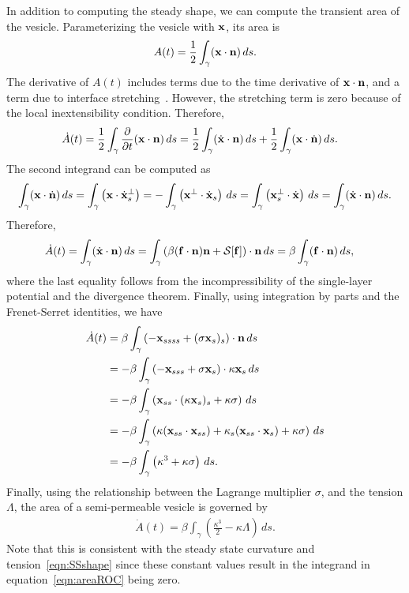 \documentclass[aps,prl,showpacs]{revtex4}
\begin{document}
In addition to computing the steady shape, we can compute the transient
area of the vesicle. Parameterizing the vesicle with $\mathbf{x}$, its area is
\begin{align}
  A(t) = \frac{1}{2}\int_{\gamma} (\mathbf{x} \cdot \mathbf{n})\, ds .
\end{align}
The derivative of $A(t)$ includes terms due to the time derivative of
$\mathbf{x} \cdot \mathbf{n}$, and a term due to interface
stretching~\cite{lai-tse-hua2008}. However, the stretching term is zero
because of the local inextensibility condition. Therefore,
\begin{align}
  \dot{A}(t) &= \frac{1}{2} \int_{\gamma} \frac{\partial }{\partial t} 
    (\mathbf{x} \cdot \mathbf{n}) \, ds = 
  \frac{1}{2} \int_{\gamma} (\dot{\mathbf{x}} \cdot \mathbf{n})\, ds  + 
  \frac{1}{2} \int_{\gamma} (\mathbf{x} \cdot \dot{\mathbf{n}})\, ds.
\end{align}
The second integrand can be computed as
\begin{align}
  \int_\gamma (\mathbf{x} \cdot \dot{\mathbf{n}})\, ds 
    = \int_\gamma \left(\mathbf{x} \cdot \dot{\mathbf{x}}_s^\perp \right)
    = -\int_\gamma \left(\mathbf{x}^\perp \cdot \dot{\mathbf{x}}_s\right)\, ds 
    = \int_\gamma \left(\mathbf{x}_s^\perp \cdot \dot{\mathbf{x}}\right)\, ds 
    = \int_\gamma (\dot{\mathbf{x}} \cdot \mathbf{n})\, ds.
\end{align}
Therefore,
\begin{align}
  \dot{A}(t) &= \int_\gamma (\dot{\mathbf{x}} \cdot \mathbf{n})\, ds 
  = \int_\gamma \left(\beta (\mathbf{f} \cdot \mathbf{n})\mathbf{n} + \mathcal{S}[\mathbf{f}]\right) 
      \cdot \mathbf{n}\, ds 
  = \beta \int_\gamma (\mathbf{f} \cdot \mathbf{n})\, ds,
\end{align}
where the last equality follows from the incompressibility of the
single-layer potential and the divergence theorem.  Finally, using
integration by parts and the Frenet-Serret identities, we have
\begin{align}
  \dot{A}(t) &= \beta \int_\gamma \left( -\mathbf{x}_{ssss} + 
    (\sigma \mathbf{x}_s)_s \right) \cdot \mathbf{n} \, ds \\
  &= -\beta \int_\gamma \left(-\mathbf{x}_{sss} + \sigma \mathbf{x}_s 
    \right) \cdot \kappa \mathbf{x}_s \, ds \\
  &= -\beta \int_\gamma \left(\mathbf{x}_{ss} \cdot 
    (\kappa \mathbf{x}_s)_s + \kappa \sigma \right) \, ds \\
  &= -\beta \int_\gamma \left(\kappa (\mathbf{x}_{ss} \cdot \mathbf{x}_{ss}) + 
    \kappa_s (\mathbf{x}_{ss} \cdot \mathbf{x}_s) + \kappa \sigma \right) 
    \, ds \\
  &= -\beta \int_\gamma \left(\kappa^3 + \kappa \sigma \right) 
    \, ds.
\end{align}
Finally, using the relationship between the Lagrange multiplier
$\sigma$, and the tension $\Lambda$, the area of a semi-permeable
vesicle is governed by
\begin{align}
  \dot{A}(t) = \beta \int_\gamma \left(
    \frac{\kappa^3}{2} - \kappa \Lambda \right) \, ds.
  \label{eqn:areaROC}
\end{align}
Note that this is consistent with the steady state curvature and
tension~\eqref{eqn:SSshape} since these constant values result in the
integrand in equation~\eqref{eqn:areaROC} being zero.
\end{document}
